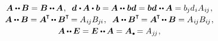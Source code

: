 \nopagebreak\vspace{-0.1em}\begin{equation}
\begin{array}{c}
\bm{A} \dotdotp \hspace{-0.1ex} \bm{B} = \bm{B} \dotdotp \hspace{-0.1ex} \bm{A}
\hspace{.12ex} ,
\;\;
\bm{d} \hspace{.1ex} \dotp \hspace{-0.15ex} \bm{A} \dotp \bm{b} = \hspace{-0.1ex} \bm{A} \dotdotp \hspace{.1ex} \bm{b}\bm{d} = \bm{b}\bm{d} \hspace{.1ex} \dotdotp \hspace{-0.1ex} \bm{A} = b_{\hspace{-0.1ex}j} d_{\hspace{.1ex}i} A_{\hspace{.1ex}i\hspace{-0.1ex}j} \hspace{.12ex} ,
\\[.2em]
%
\bm{A} \dotdotp \bm{B} = \bm{A}^{\hspace{-0.16ex}\T} \hspace{-0.2ex} \dotdotp \bm{B}^{\T} \hspace{-0.2ex} = A_{\hspace{.1ex}i\hspace{-0.1ex}j} B_{\hspace{-0.1ex}j\hspace{-0.06ex}i}
\hspace{.12ex} ,
\;\;
\bm{A} \dotdotp \bm{B}^{\T} \hspace{-0.2ex} = \bm{A}^{\hspace{-0.16ex}\T} \hspace{-0.2ex} \dotdotp \bm{B} = A_{\hspace{.1ex}i\hspace{-0.1ex}j} B_{i\hspace{-0.1ex}j}
\hspace{.12ex} ,
\\[.2em]
%
\bm{A} \hspace{-0.1ex} \dotdotp \hspace{-0.1ex} \UnitDyad = \UnitDyad \dotdotp \hspace{-0.1ex} \bm{A} = \bm{A}\hspace{.15ex}\tracedot = A_{j\hspace{-0.15ex}j} \hspace{.12ex} ,

\end{array}
\end{equation}
